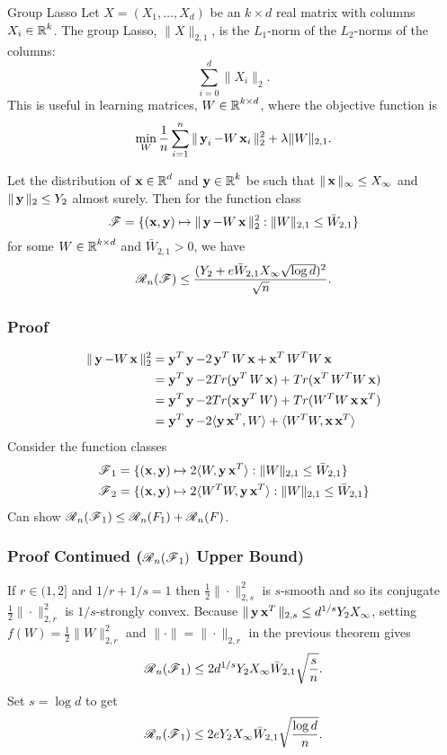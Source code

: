 

\begin{frame}{Group Lasso}
Let  $X = (X_1, \dots, X_d)$ be an $k \times d$ real matrix with columns
$X_i \in \R^k$. The group Lasso, $\|X\|_{2,1}$, is the $L_1$-norm of the $L_2$-norms of
the columns:
\[\sum_{i = 0}^d \|X_i\|_2.\]
This is useful in learning matrices, $W \in \R^{k \times d}$, where the objective function is
\[ \min_W \frac{1}{n} \sum_{i=1}^n \|\y_i - W\x_i\|_2^2 + \lambda \|W\|_{2,1}.\]
\end{frame}


\begin{frame}
\begin{theorem}
Let the distribution of $\x \in \R^d$ and $\y \in \R^k$ be such that
$\|\x\|_\infty \le X_\infty$ and $\|\y\|_2 \le Y_2$ almost surely.
Then for the function class
\[\F = \{(\x, \y) \mapsto \|\y - W\x\|_2^2 : \|W\|_{2,1} \le \bar{W}_{2,1}\}\]
for some $W \in \R^{k \times d}$ and $\bar{W}_{2,1} > 0$, we have
\[\Rad_n(\F) \le \frac{(Y_2 + e\bar{W}_{2,1} X_\infty \sqrt{\log d})^2}{\sqrt{n}}.\]
\end{theorem}
\end{frame}


\begin{frame}
\frametitle{Proof}
\begin{align*}
\|\y - W\x\|_2^2 &= \y^T \y - 2 \y^T W \x + \x^T W^T W \x \\
   &= \y^T \y - 2 Tr(\y^T W \x) + Tr(\x^T W^T W \x) \\
   &= \y^T \y - 2 Tr(\x \y^T W) + Tr(W^T W \x \x^T) \\
   &= \y^T \y - 2\langle \y \x^T, W\rangle + \langle W^TW, \x \x^T\rangle
\end{align*}
Consider the function classes
\begin{align*}
\F_1 &= \{(\x, \y) \mapsto 2\langle W, \y\x^T\rangle : \|W\|_{2,1} \le \bar{W}_{2,1}\} \\
\F_2 &= \{(\x, \y) \mapsto 2\langle W^T W, \y\x^T\rangle : \|W\|_{2,1} \le \bar{W}_{2,1}\}
\end{align*}
Can show $\Rad_n(\F_1) \le \Rad_n(F_1) + \Rad_n(F)$.
\end{frame}


\begin{frame}
\frametitle{Proof Continued ($\Rad_n(\F_1)$ Upper Bound)}
If $r \in (1,2]$ and $1/r + 1/s = 1$ then $\frac{1}{2} \| \cdot \|_{2,s}^2$ is $s$-smooth and so
its conjugate $\frac{1}{2}\| \cdot \|_{2,r}^2$ is $1/s$-strongly convex. 
Because $\|\y \x^T\|_{2,s} \le d^{1/s} Y_2 X_\infty$, 
setting $f(W) = \frac{1}{2}\|W\|_{2,r}^2$ and $\| \cdot \| = \| \cdot \|_{2,r}$ in 
the previous theorem gives
\[\Rad_n(\F_1) \le 2d^{1/s}Y_2X_\infty \bar{W}_{2,1}\sqrt{\frac{s}{n}}.\]
Set $s = \log d$ to get
\[\Rad_n(\F_1) \le 2eY_2X_\infty \bar{W}_{2,1}\sqrt{\frac{\log d}{n}}.\]
\end{frame}


